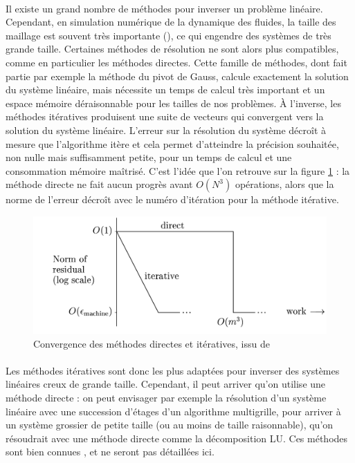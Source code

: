 		\paragraph{}
		Il existe un grand nombre de méthodes pour inverser un problème linéaire.
		Cependant, en simulation numérique de la dynamique des fluides, la taille des maillage est souvent très importante (), ce qui engendre des systèmes de très grande taille.
		Certaines méthodes de résolution ne sont alors plus compatibles, comme en particulier les méthodes directes.
		Cette famille de méthodes, dont fait partie par exemple la méthode du pivot de Gauss, calcule exactement la solution du système linéaire, mais nécessite un temps de calcul très important et un espace mémoire déraisonnable pour les tailles de nos problèmes.
		À l'inverse, les méthodes itératives produisent une suite de vecteurs qui convergent vers la solution du système linéaire.
		L'erreur sur la résolution du système décroît à mesure que l'algorithme itère et cela permet d'atteindre la précision souhaitée, non nulle mais suffisamment petite, pour un temps de calcul et une consommation mémoire maîtrisé.
		C'est l'idée que l'on retrouve sur la figure \ref{fig:direct-iterative} : la méthode directe ne fait aucun progrès avant $O\left(N^3\right)$ opérations, alors que la norme de l'erreur décroît avec le numéro d'itération pour la méthode itérative.

		\begin{figure}
			\centering
			\includegraphics[width=.7\textwidth]{images/direct-iterative.png}
			\caption{Convergence des méthodes directes et itératives, issu de \cite{TrefethenBau1997}}
			\label{fig:direct-iterative}
		\end{figure}

		\paragraph{}
		Les méthodes itératives sont donc les plus adaptées pour inverser des systèmes linéaires creux de grande taille.
		Cependant, il peut arriver qu'on utilise une méthode directe : on peut envisager par exemple la résolution d'un système linéaire avec une succession d'étages d'un algorithme multigrille, pour arriver à un système grossier de petite taille (ou au moins de taille raisonnable), qu'on résoudrait avec une méthode directe comme la décomposition LU.
		Ces méthodes sont bien connues \cite{TrefethenBau1997}, et ne seront pas détaillées ici.


